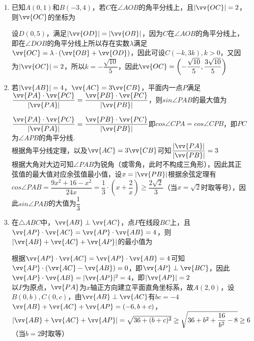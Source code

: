 \begin{enumerate}
    \item 已知$A(0, 1)$和$B(-3, 4)$，若$C$在$\angle AOB$的角平分线上，且$|\vv{OC}| = 2$，则$\vv{OC}$的坐标为
    \begin{jieda}
        设$D(0, 5)$，满足$|\vv{OD}| = |\vv{OB}|$，因为$C$在$\angle AOB$的角平分线上，即在$\angle DOB$的角平分线上所以存在实数$\lambda$满足$\vv{OC} = \lambda \cdot (\vv{OB} + \vv{OD})$，因此可设$C(-k, 3k), k>0$，又因为$|\vv{OC}| = 2$，所以$k = -\dfrac{\sqrt{10}}{5}$，因此$\vv{OC} = \left(-\dfrac{\sqrt{10}}{5}, \dfrac{3\sqrt{10}}{5}\right)$
    \end{jieda}

    \item 若$|\vv{AB}| = 4$，$\vv{AC} = 3\vv{CB}$，平面内一点$P$满足$\dfrac{\vv{PA} \cdot \vv{PC}}{|\vv{PA}|} = \dfrac{\vv{PB} \cdot \vv{PC}}{|\vv{PB}|}$，则$sin\angle PAB$的最大值为
    \begin{jieda}
        $\dfrac{\vv{PA} \cdot \vv{PC}}{|\vv{PA}|} = \dfrac{\vv{PB} \cdot \vv{PC}}{|\vv{PB}|}$即$cos\angle CPA = cos\angle CPB$，即$PC$为$\angle APB$的角平分线. \\
        根据角平分线定理，以及$\vv{AC} = 3\vv{CB}$可知$\dfrac{|\vv{PA}|}{|\vv{PB}|} = 3$ \\
        根据大角对大边可知$\angle PAB$为锐角（或零角，此时不构成三角形），因此其正弦值的最大值对应余弦值最小值，设$x = |\vv{PB}|$根据余弦定理有$cos\angle PAB = \dfrac{9x^2 + 16 - x^2}{24x} = \dfrac{1}{3} \cdot \left(x + \dfrac{2}{x}\right) \geq \dfrac{2\sqrt{2}}{3}$（当$x = \sqrt{2}$时取等号），因此$sin\angle PAB$的大值为$\dfrac{1}{3}$
    \end{jieda}

    \item 在$\triangle ABC$中，$\vv{AB} \perp \vv{AC}$，点$P$在线段$BC$上，且$\vv{AP} \cdot \vv{AC} = \vv{AP} \cdot \vv{AB} = 4$，则$|\vv{AB} + \vv{AC} + \vv{AP}|$的最小值为
    \begin{jieda}
        根据$\vv{AP} \cdot \vv{AC} = \vv{AP} \cdot \vv{AB} = 4$可知$\vv{AP} \cdot (\vv{AC} - \vv{AB}) = 0$，即$\vv{AP} \perp \vv{BC}$，因此$\vv{AP} \cdot \vv{AB} = |\vv{AP}|^2 = 4$，即$|\vv{AP}| = 2$ \\
        以$P$为原点，$\vv{PA}$为$x$轴正方向建立平面直角坐标系，故$A(2, 0)$，设$B(0, b), C(0, c)$，由$\vv{AB} \perp \vv{AC}$有$bc = -4$ \\
        $\vv{AB} + \vv{AC} + \vv{AP} = (-6, b+c)$，$|\vv{AB} + \vv{AC} + \vv{AP}| = \sqrt{36 + (b+c)^2} \geq \sqrt{36 + b^2 + \dfrac{16}{b^2} - 8} \geq 6$（当$b = 2$时取等）
    \end{jieda}
\end{enumerate}

